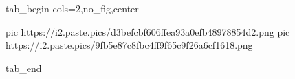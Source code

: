  
 
 
 
 

\ifcmt
  tab_begin cols=2,no_fig,center

     pic https://i2.paste.pics/d3befcbf606ffea93a0efb48978854d2.png
		 pic https://i2.paste.pics/9fb5e87c8fbc4ff9f65c9f26a6cf1618.png

  tab_end
\fi
